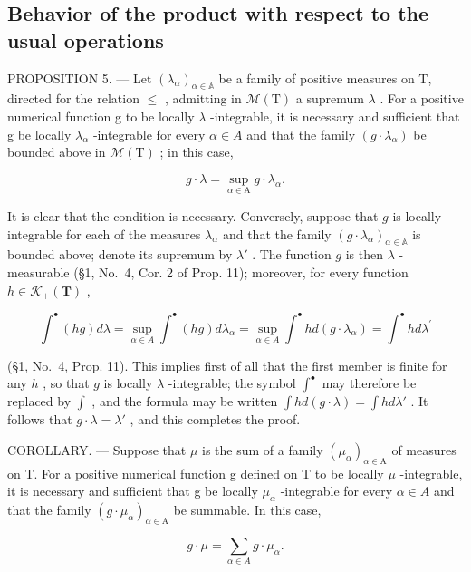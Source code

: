 \subsection{Behavior of the product with respect to the usual operations}

PROPOSITION 5. --- Let \((\lambda_{\alpha})_{\alpha\in\mathbb{A}}\) be a family of positive measures on T, directed for the relation \(\leqslant\) , admitting in \(\mathcal{M}(\mathrm{T})\) a supremum \(\lambda\) . For a positive numerical function g to be locally \(\lambda\) -integrable, it is necessary and sufficient that g be locally \(\lambda_{\alpha}\) -integrable for every \(\alpha\in A\) and that the family \((g\cdot\lambda_{\alpha})\) be bounded above in \(\mathcal{M}(\mathrm{T})\) ; in this case,

\[
g \cdot \lambda = \sup _ {\alpha \in \mathrm{A}} g \cdot \lambda_ {\alpha}.
\]

It is clear that the condition is necessary. Conversely, suppose that \(g\) is locally integrable for each of the measures \(\lambda_{\alpha}\) and that the family \((g \cdot \lambda_{\alpha})_{\alpha \in \mathbb{A}}\) is bounded above; denote its supremum by \(\lambda'\) . The function \(g\) is then \(\lambda\) -measurable (§1, No.~4, Cor. 2 of Prop. 11); moreover, for every function \(h \in \mathcal{K}_{+}(\mathbf{T})\) ,

\[
\int^ {\bullet} (h g) d \lambda = \sup _ {\alpha \in A} \int^ {\bullet} (h g) d \lambda_ {\alpha} = \sup _ {\alpha \in A} \int^ {\bullet} h d (g \cdot \lambda_ {\alpha}) = \int^ {\bullet} h d \lambda^ {\prime}
\]

(§1, No.~4, Prop. 11). This implies first of all that the first member is finite for any \(h\) , so that \(g\) is locally \(\lambda\) -integrable; the symbol \(\int^{\bullet}\) may therefore be replaced by \(\int\) , and the formula may be written \(\int h d(g \cdot \lambda) = \int h d\lambda'\) . It follows that \(g \cdot \lambda = \lambda'\) , and this completes the proof.

COROLLARY. --- Suppose that \(\mu\) is the sum of a family \((\mu_{\alpha})_{\alpha\in\mathrm{A}}\) of measures on T. For a positive numerical function g defined on T to be locally \(\mu\) -integrable, it is necessary and sufficient that g be locally \(\mu_{\alpha}\) -integrable for every \(\alpha\in A\) and that the family \((g\cdot\mu_{\alpha})_{\alpha\in\mathrm{A}}\) be summable. In this case,

\[
g \cdot \mu = \sum_ {\alpha \in A} g \cdot \mu_ {\alpha}.\tag{7}
\]

